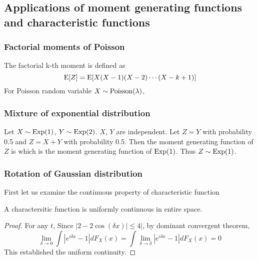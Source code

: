 \subsection{Applications of moment generating functions and characteristic functions}
\subsubsection{Factorial moments of Poisson}
The factorial k-th moment is defined as
$$\operatorname{E}[Z] = \operatorname{E}[X(X-1)(X-2)\cdots(X-k+1)]$$
For Poisson random variable $X\sim \mathrm{Poisson}(\lambda)$,
\subsubsection{Mixture of exponential distribution}
Let $X\sim \mathrm{Exp}(1)$, $Y\sim \mathrm{Exp}(2)$. $X$, $Y$ are independent. Let $Z = Y$ with probability 0.5 and $Z=X+Y$ with probability 0.5. Then the moment generating function of $Z$ is
which is the moment generating function of $\mathrm{Exp}(1)$. Thus $Z\sim \mathrm{Exp}(1)$.
\subsubsection{Rotation of Gaussian distribution}
First let us examine the continuous property of characteristic function
\begin{lemma}
	A charactersitic function is uniformly continuous in entire space.
\end{lemma}
\begin{proof}
	For any $t$,
	Since $|2-2\cos (\delta x)|\leq 4|$, by dominant convergent theorem,
	$$\lim_{\delta \to 0} \int |e^{i\delta x} - 1|dF_X(x) = \int \lim_{\delta \to \delta} |e^{i\delta x} - 1|dF_X(x) = 0$$ 
	This established the uniform continuity.
\end{proof}

